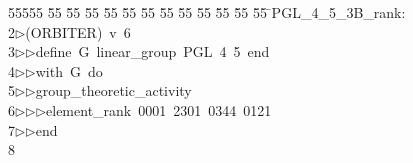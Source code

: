 %
%
\begin{tabbing}
55555 \= 55 \= 55 \= 55 \= 55 \= 55 \= 55 \= 55 \= 55 \= 55 \= 55 \= 55 \= 55 \= \>PGL\_4\_5\_3B\_rank:\\[0pt]
2\>$\triangleright$\>(ORBITER)\ v\ 6\ \\[0pt]
3\>$\triangleright$\>$\triangleright$\>define\ G\ linear\_group\ PGL\ 4\ 5\ end\ \\[0pt]
4\>$\triangleright$\>$\triangleright$\>with\ G\ do\ \\[0pt]
5\>$\triangleright$\>$\triangleright$\>group\_theoretic\_activity\ \\[0pt]
6\>$\triangleright$\>$\triangleright$\>$\triangleright$\>element\_rank\ 0001\ 2301\ 0344\ 0121\ \\[0pt]
7\>$\triangleright$\>$\triangleright$\>end\\[0pt]
8\>\end{tabbing}
